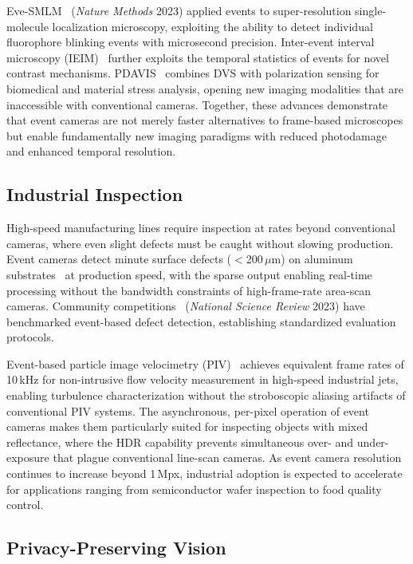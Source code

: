 Eve-SMLM~\cite{bhatt2023evesmlm} (\textit{Nature Methods} 2023) applied events to super-resolution single-molecule localization microscopy, exploiting the ability to detect individual fluorophore blinking events with microsecond precision. Inter-event interval microscopy (IEIM)~\cite{wang2025ieim} further exploits the temporal statistics of events for novel contrast mechanisms. PDAVIS~\cite{gruev2023pdavis} combines DVS with polarization sensing for biomedical and material stress analysis, opening new imaging modalities that are inaccessible with conventional cameras. Together, these advances demonstrate that event cameras are not merely faster alternatives to frame-based microscopes but enable fundamentally new imaging paradigms with reduced photodamage and enhanced temporal resolution.


\subsection{Industrial Inspection}
\label{sec:appl_industrial}

High-speed manufacturing lines require inspection at rates beyond conventional cameras, where even slight defects must be caught without slowing production. Event cameras detect minute surface defects ($<$200\,$\mu$m) on aluminum substrates~\cite{li2024aluminumdefect} at production speed, with the sparse output enabling real-time processing without the bandwidth constraints of high-frame-rate area-scan cameras. Community competitions~\cite{wang2023surfacedefect} (\textit{National Science Review} 2023) have benchmarked event-based defect detection, establishing standardized evaluation protocols.

Event-based particle image velocimetry (PIV)~\cite{guo2025eventpiv} achieves equivalent frame rates of 10\,kHz for non-intrusive flow velocity measurement in high-speed industrial jets, enabling turbulence characterization without the stroboscopic aliasing artifacts of conventional PIV systems. The asynchronous, per-pixel operation of event cameras makes them particularly suited for inspecting objects with mixed reflectance, where the HDR capability prevents simultaneous over- and under-exposure that plague conventional line-scan cameras. As event camera resolution continues to increase beyond 1\,Mpx, industrial adoption is expected to accelerate for applications ranging from semiconductor wafer inspection to food quality control.


\subsection{Privacy-Preserving Vision}
\label{sec:appl_privacy}

